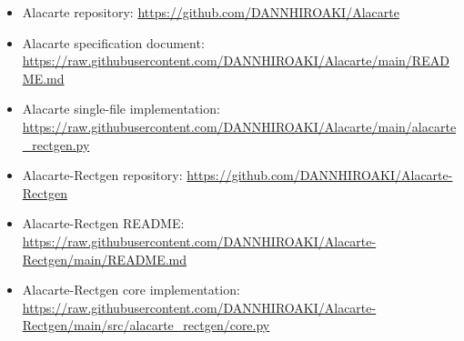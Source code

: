 \documentclass[11pt,a4paper]{article}
\begin{document}
\begin{itemize}
  \item Alacarte repository: \url{https://github.com/DANNHIROAKI/Alacarte}
  \item Alacarte specification document: \url{https://raw.githubusercontent.com/DANNHIROAKI/Alacarte/main/README.md}
  \item Alacarte single-file implementation: \url{https://raw.githubusercontent.com/DANNHIROAKI/Alacarte/main/alacarte_rectgen.py}
  \item Alacarte-Rectgen repository: \url{https://github.com/DANNHIROAKI/Alacarte-Rectgen}
  \item Alacarte-Rectgen README: \url{https://raw.githubusercontent.com/DANNHIROAKI/Alacarte-Rectgen/main/README.md}
  \item Alacarte-Rectgen core implementation: \url{https://raw.githubusercontent.com/DANNHIROAKI/Alacarte-Rectgen/main/src/alacarte_rectgen/core.py}
\end{itemize}
\end{document}
